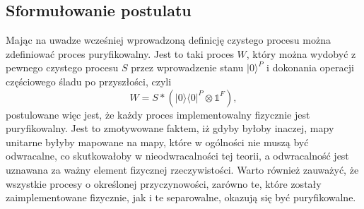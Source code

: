 \documentclass[10pt]{article} %
\newcommand{\Ket}[1]{|#1\rangle}
\newcommand{\Bra}[1]{\langle#1|}
\newcommand{\I}{\mathbb{1}}
\begin{document}
\subsection{Sformułowanie postulatu}
Mając na uwadze wcześniej wprowadzoną definicję czystego procesu można zdefiniować proces puryfikowalny. Jest to taki proces $W$, który można wydobyć
z pewnego czystego procesu $S$ przez wprowadzenie stanu $\Ket{0}^P$ i dokonania operacji częściowego śladu po przyszłości, czyli
\begin{equation}
W = S * \left( \Ket{0}\Bra{0}^P \otimes \I^F \right),
\end{equation}
postulowane więc jest, że każdy proces implementowalny fizycznie jest puryfikowalny.
Jest to zmotywowane faktem, iż gdyby byłoby inaczej,
mapy unitarne byłyby mapowane na mapy, które w ogólności nie muszą być odwracalne, co skutkowałoby w nieodwracalności tej teorii, a odwracalność jest uznawana za ważny element fizycznej rzeczywistości. Warto również zauważyć, że wszystkie procesy o określonej przyczynowości, zarówno te, które zostały zaimplementowane fizycznie, jak i te separowalne, okazują się być puryfikowalne.
\end{document}
